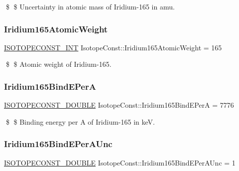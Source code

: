 \$ \$ Uncertainty in atomic mass of Iridium-\/165 in amu. \mbox{\label{group___isotope_const-_iridium-_ir165_gaa71f82a78adfeedee28b6da8de1dd3be}} 
\subsubsection{\texorpdfstring{Iridium165\+Atomic\+Weight}{Iridium165AtomicWeight}}
{\footnotesize\ttfamily \mbox{\hyperlink{group___isotope_const-_macros_ga5f18360b3e99483a35c32d789e62621c}{I\+S\+O\+T\+O\+P\+E\+C\+O\+N\+S\+T\+\_\+\+I\+NT}} Isotope\+Const\+::\+Iridium165\+Atomic\+Weight = 165}

\$ \$ Atomic weight of Iridium-\/165. \mbox{\label{group___isotope_const-_iridium-_ir165_gada74e8ac97f49e6661e72a7fc52cc04c}} 
\subsubsection{\texorpdfstring{Iridium165\+Bind\+E\+PerA}{Iridium165BindEPerA}}
{\footnotesize\ttfamily \mbox{\hyperlink{group___isotope_const-_macros_ga8f45a7272ce02c0b4c65c44636ed719a}{I\+S\+O\+T\+O\+P\+E\+C\+O\+N\+S\+T\+\_\+\+D\+O\+U\+B\+LE}} Isotope\+Const\+::\+Iridium165\+Bind\+E\+PerA = 7776}

\$ \$ Binding energy per A of Iridium-\/165 in keV. \mbox{\label{group___isotope_const-_iridium-_ir165_gacb484ec05d1f205ce83c207162ea207c}} 
\subsubsection{\texorpdfstring{Iridium165\+Bind\+E\+Per\+A\+Unc}{Iridium165BindEPerAUnc}}
{\footnotesize\ttfamily \mbox{\hyperlink{group___isotope_const-_macros_ga8f45a7272ce02c0b4c65c44636ed719a}{I\+S\+O\+T\+O\+P\+E\+C\+O\+N\+S\+T\+\_\+\+D\+O\+U\+B\+LE}} Isotope\+Const\+::\+Iridium165\+Bind\+E\+Per\+A\+Unc = 1}

